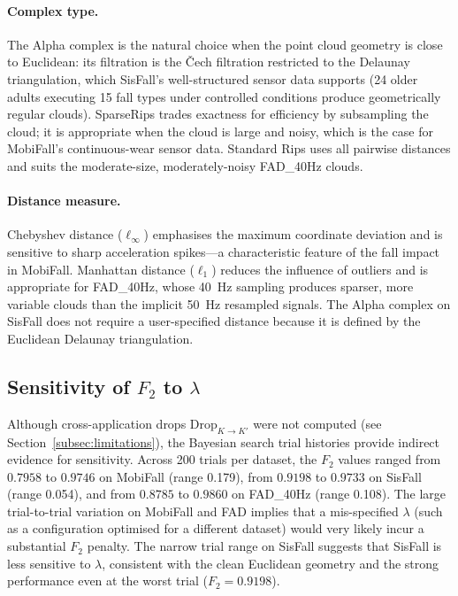 \paragraph{Complex type.}
The Alpha complex is the natural choice when the point cloud geometry is close to
Euclidean: its filtration is the Čech filtration restricted to the Delaunay triangulation,
which SisFall's well-structured sensor data supports (24 older adults executing 15 fall
types under controlled conditions produce geometrically regular clouds).  SparseRips
trades exactness for efficiency by subsampling the cloud; it is appropriate when the
cloud is large and noisy, which is the case for MobiFall's continuous-wear sensor data.
Standard Rips uses all pairwise distances and suits the moderate-size, moderately-noisy
FAD\_40Hz clouds.

\paragraph{Distance measure.}
Chebyshev distance ($\ell_\infty$) emphasises the maximum coordinate deviation and is
sensitive to sharp acceleration spikes---a characteristic feature of the fall impact in
MobiFall.  Manhattan distance ($\ell_1$) reduces the influence of outliers and is
appropriate for FAD\_40Hz, whose 40~Hz sampling produces sparser, more variable clouds
than the implicit 50~Hz resampled signals.  The Alpha complex on SisFall does not
require a user-specified distance because it is defined by the Euclidean Delaunay
triangulation.

\subsection{Sensitivity of $F_2$ to $\lambda$}

Although cross-application drops $\mathrm{Drop}_{K\to K'}$ were not computed (see
Section~\ref{subsec:limitations}), the Bayesian search trial histories provide indirect
evidence for sensitivity.  Across 200 trials per dataset, the $F_2$ values ranged from
$0.7958$ to $0.9746$ on MobiFall (range 0.179), from $0.9198$ to $0.9733$ on SisFall
(range 0.054), and from $0.8785$ to $0.9860$ on FAD\_40Hz (range 0.108).  The large
trial-to-trial variation on MobiFall and FAD implies that a mis-specified $\lambda$
(such as a configuration optimised for a different dataset) would very likely incur
a substantial $F_2$ penalty.  The narrow trial range on SisFall suggests that SisFall
is less sensitive to $\lambda$, consistent with the clean Euclidean geometry and the
strong performance even at the worst trial ($F_2=0.9198$).

